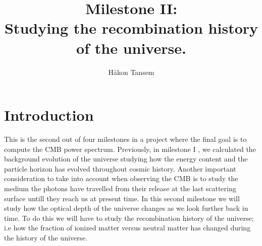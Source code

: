 \documentclass[onecolumn]{aastex62}
\begin{document}
\title{\Large Milestone II:\\Studying the recombination history of the universe.}


\author{Håkon Tansem}

\section{Introduction} \label{sec:intro}
This is the second out of four milestones in a project where the final goal is to compute the CMB power spectrum. Previously, in milestone I \cite{TansemI:2020}, we calculated the background evolution of the universe studying how the energy content and the particle horizon has evolved throughout cosmic history. Another important consideration to take into account when observing the CMB is to study the medium the photons have travelled from their release at the last scattering surface untill they reach us at present time. In this second milestone we will study how the optical depth of the universe changes as we look further back in time. To do this we will have to study the recombination history of the universe; i.e how the fraction of ionized matter versus neutral matter has changed during the history of the universe. 
\end{document}
